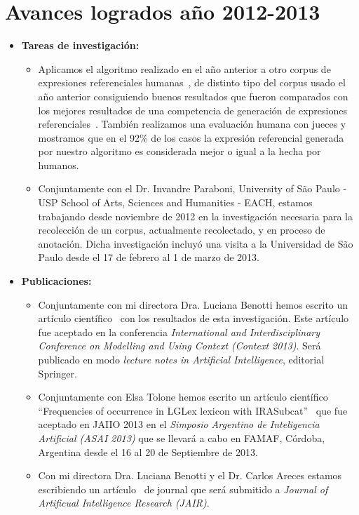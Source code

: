 \section{Avances logrados a\~no 2012-2013 }
\label{progreso}

\begin{itemize}
\item \textbf{Tareas de investigaci\'on:}
\begin{itemize}
\item Aplicamos el algoritmo realizado en el a\~no anterior a otro corpus de expresiones referenciales humanas~\cite{gatt-balz-kow:2008:ENLG}, de distinto tipo del corpus usado el a\~no anterior consiguiendo buenos resultados que fueron comparados con los mejores resultados de una competencia de generaci\'on de expresiones referenciales~\cite{KrahmerGRAPH}. Tambi\'en realizamos una evaluaci\'on humana con jueces y mostramos que en el 92\% de los casos la expresi\'on referencial generada por nuestro algoritmo es considerada mejor o igual a la hecha por humanos.

\item Conjuntamente con el Dr. Invandre Paraboni, University of S\~ao Paulo - USP 
School of Arts, Sciences and Humanities - EACH, estamos trabajando desde noviembre de 2012 en la investigaci\'on necesaria para la recolecci\'on de un corpus, actualmente recolectado, y en proceso de anotaci\'on. Dicha investigaci\'on incluy\'o una visita a la Universidad de S\~ao Paulo desde el 17 de febrero al 1 de marzo de 2013.
\end{itemize}
\item \textbf{Publicaciones:} 
\begin{itemize}
\item Conjuntamente con mi directora Dra. Luciana Benotti hemos escrito un art\'iculo cient\'ifico~\cite{benotti-altamirano-context2013} con los resultados de esta investigaci\'on. Este art\'iculo fue aceptado en la conferencia \emph{International and Interdisciplinary Conference on Modelling and Using Context (Context 2013)}. Ser\'a publicado en modo \emph{lecture notes in Artificial Intelligence}, editorial Springer. 
\item Conjuntamente con Elsa Tolone hemos escrito un art\'iculo cient\'ifico ``Frequencies of occurrence in LGLex lexicon with IRASubcat''~\cite{tolone-altamirano} que fue aceptado en JAIIO 2013 en el \emph{Simposio Argentino de Inteligencia Artificial (ASAI 2013)} que se llevar\'a a cabo en FAMAF, C\'ordoba, Argentina desde el 16 al 20 de Septiembre de 2013.
\item Con mi directora Dra. Luciana Benotti y el Dr. Carlos Areces estamos escribiendo un art\'iculo~\cite{benotti-altamirano-jair} de journal que ser\'a submitido a \emph{Journal of Artificual Intelligence Research (JAIR)}.
\end{itemize}


\end{itemize}
